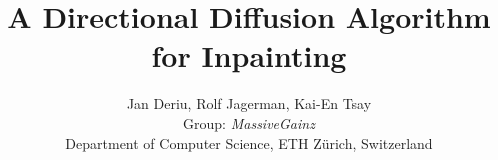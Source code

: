 \documentclass[10pt,conference,compsocconf]{IEEEtran}
\begin{document}
\title{A Directional Diffusion Algorithm for Inpainting}

\author{
  Jan Deriu, Rolf Jagerman, Kai-En Tsay\\
  Group: \textit{MassiveGainz}\\
  Department of Computer Science, ETH Zürich, Switzerland
}

\maketitle













%




\end{document}
